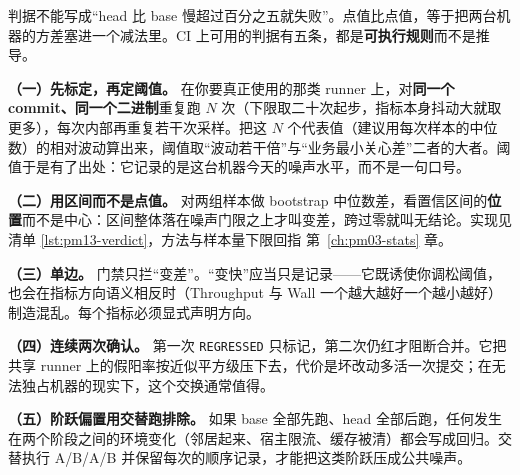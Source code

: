 \documentclass[12pt,a4paper,fontset=fandol]{ctexbook}
\newcommand{\Tp}[1]{\texttt{#1}}
\newcommand{\Lang}[1]{\textsf{#1}}
\newcommand{\MWall}{\Lang{Wall}}
\newcommand{\MThr}{\Lang{Throughput}}
\begin{document}
判据不能写成``head 比 base 慢超过百分之五就失败''。点值比点值，等于把两台机器的方差塞进一个减法里。CI 上可用的判据有五条，都是\textbf{可执行规则}而不是推导。

\textbf{（一）先标定，再定阈值。} 在你要真正使用的那类 runner 上，对\textbf{同一个 commit、同一个二进制}重复跑 $N$ 次（下限取二十次起步，指标本身抖动大就取更多），每次内部再重复若干次采样。把这 $N$ 个代表值（建议用每次样本的中位数）的相对波动算出来，阈值取``波动若干倍''与``业务最小关心差''二者的大者。阈值于是有了出处：它记录的是这台机器今天的噪声水平，而不是一句口号。

\textbf{（二）用区间而不是点值。} 对两组样本做 bootstrap 中位数差，看置信区间的\textbf{位置}而不是中心：区间整体落在噪声门限之上才叫变差，跨过零就叫无结论。实现见清单 \ref{lst:pm13-verdict}，方法与样本量下限回指 第~\ref{ch:pm03-stats} 章。

\textbf{（三）单边。} 门禁只拦``变差''。``变快''应当只是记录——它既诱使你调松阈值，也会在指标方向语义相反时（\MThr{} 与 \MWall{} 一个越大越好一个越小越好）制造混乱。每个指标必须显式声明方向。

\textbf{（四）连续两次确认。} 第一次 \Tp{REGRESSED} 只标记，第二次仍红才阻断合并。它把共享 runner 上的假阳率按近似平方级压下去，代价是坏改动多活一次提交；在无法独占机器的现实下，这个交换通常值得。

\textbf{（五）阶跃偏置用交替跑排除。} 如果 base 全部先跑、head 全部后跑，任何发生在两个阶段之间的环境变化（邻居起来、宿主限流、缓存被清）都会写成回归。交替执行 A/B/A/B 并保留每次的顺序记录，才能把这类阶跃压成公共噪声。
\end{document}
